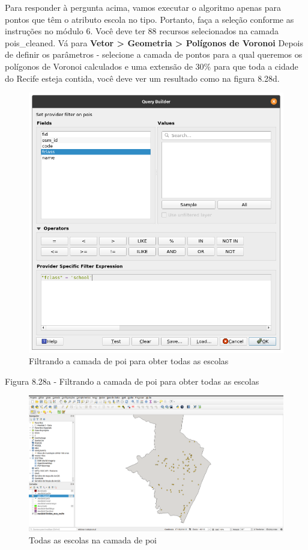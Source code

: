 \documentclass[
  portuguese,
]{krantz}
\begin{document}
Para responder à pergunta acima, vamos executar o algoritmo apenas para pontos que têm o atributo escola no tipo. Portanto, faça a seleção conforme as instruções no módulo 6. Você deve ter 88 recursos selecionados na camada pois\_cleaned. Vá para \textbf{Vetor \textgreater{} Geometria \textgreater{} Polígonos de Voronoi} Depois de definir os parâmetros - selecione a camada de pontos para a qual queremos os polígonos de Voronoi calculados e uma extensão de 30\% para que toda a cidade do Recife esteja contida, você deve ver um resultado como na figura 8.28d.

\begin{figure}
\centering
\includegraphics{media/modulo8/fig828_a.png}
\caption{Filtrando a camada de poi para obter todas as escolas}
\end{figure}

Figura 8.28a - Filtrando a camada de poi para obter todas as escolas

\begin{figure}
\centering
\includegraphics{media/modulo8/fig828_b.png}
\caption{Todas as escolas na camada de poi}
\end{figure}
\end{document}
